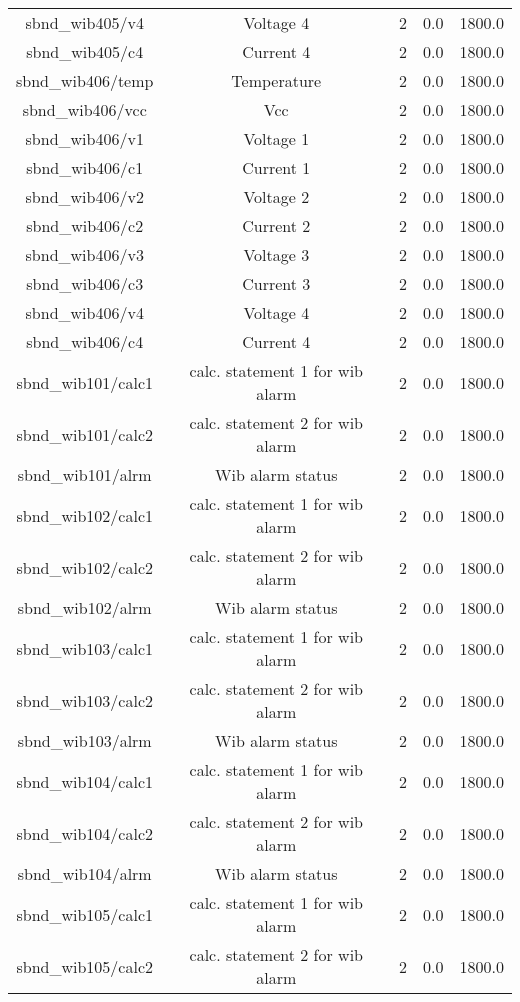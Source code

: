 \begin{center}
\begin{longtable}{c | c c c c }
sbnd\_wib405/v4 & Voltage 4 & 2 & 0.0 & 1800.0\\ 
sbnd\_wib405/c4 & Current 4 & 2 & 0.0 & 1800.0\\ 
sbnd\_wib406/temp & Temperature & 2 & 0.0 & 1800.0\\ 
sbnd\_wib406/vcc & Vcc & 2 & 0.0 & 1800.0\\ 
sbnd\_wib406/v1 & Voltage 1 & 2 & 0.0 & 1800.0\\ 
sbnd\_wib406/c1 & Current 1 & 2 & 0.0 & 1800.0\\ 
sbnd\_wib406/v2 & Voltage 2 & 2 & 0.0 & 1800.0\\ 
sbnd\_wib406/c2 & Current 2 & 2 & 0.0 & 1800.0\\ 
sbnd\_wib406/v3 & Voltage 3 & 2 & 0.0 & 1800.0\\ 
sbnd\_wib406/c3 & Current 3 & 2 & 0.0 & 1800.0\\ 
sbnd\_wib406/v4 & Voltage 4 & 2 & 0.0 & 1800.0\\ 
sbnd\_wib406/c4 & Current 4 & 2 & 0.0 & 1800.0\\ 
sbnd\_wib101/calc1 & calc. statement 1 for wib alarm & 2 & 0.0 & 1800.0\\ 
sbnd\_wib101/calc2 & calc. statement 2 for wib alarm & 2 & 0.0 & 1800.0\\ 
sbnd\_wib101/alrm & Wib alarm status & 2 & 0.0 & 1800.0\\ 
sbnd\_wib102/calc1 & calc. statement 1 for wib alarm & 2 & 0.0 & 1800.0\\ 
sbnd\_wib102/calc2 & calc. statement 2 for wib alarm & 2 & 0.0 & 1800.0\\ 
sbnd\_wib102/alrm & Wib alarm status & 2 & 0.0 & 1800.0\\ 
sbnd\_wib103/calc1 & calc. statement 1 for wib alarm & 2 & 0.0 & 1800.0\\ 
sbnd\_wib103/calc2 & calc. statement 2 for wib alarm & 2 & 0.0 & 1800.0\\ 
sbnd\_wib103/alrm & Wib alarm status & 2 & 0.0 & 1800.0\\ 
sbnd\_wib104/calc1 & calc. statement 1 for wib alarm & 2 & 0.0 & 1800.0\\ 
sbnd\_wib104/calc2 & calc. statement 2 for wib alarm & 2 & 0.0 & 1800.0\\ 
sbnd\_wib104/alrm & Wib alarm status & 2 & 0.0 & 1800.0\\ 
sbnd\_wib105/calc1 & calc. statement 1 for wib alarm & 2 & 0.0 & 1800.0\\ 
sbnd\_wib105/calc2 & calc. statement 2 for wib alarm & 2 & 0.0 & 1800.0\\ 

\end{longtable}
\end{center}
